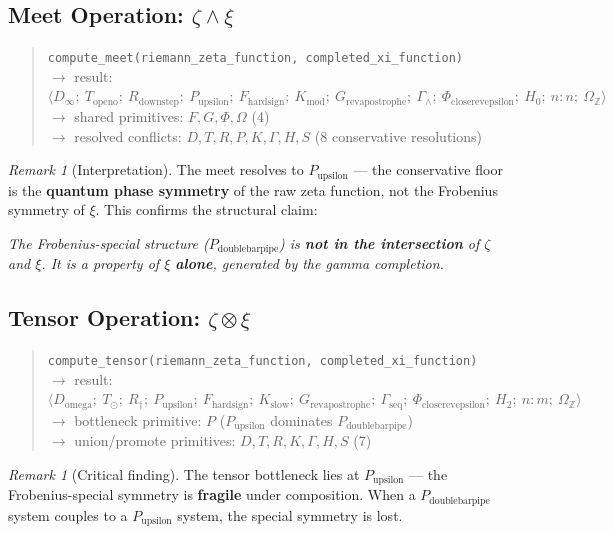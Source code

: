 \documentclass[12pt,oneside]{article}
\theoremstyle{definition}
\theoremstyle{remark}
\newtheorem{remark}[theorem]{Remark}
\newcommand{\Domega}{D_{\text{omega}}}
\newcommand{\Dinfty}{D_{\infty}}
\newcommand{\Topeno}{T_{\text{openo}}}
\newcommand{\Rdownstep}{R_{\text{downstep}}}
\newcommand{\Pdoublebarpipe}{P_{\text{doublebarpipe}}}
\newcommand{\Pupsilon}{P_{\text{upsilon}}}
\newcommand{\Fhardsign}{F_{\text{hardsign}}}
\newcommand{\Grevapostrophe}{G_{\text{revapostrophe}}}
\newcommand{\Gammaseq}{\Gamma_{\text{seq}}}
\newcommand{\Gammaconj}{\Gamma_{\wedge}}
\newcommand{\Phicloserevepsilon}{\Phi_{\text{closerevepsilon}}}
\newcommand{\Hzero}{H_0}
\newcommand{\Htwo}{H_2}
\newcommand{\OmegaZ}{\Omega_{\mathbb{Z}}}
\begin{document}
\subsection{Meet Operation: $\zeta \wedge \xi$}

\begin{quote}
\texttt{compute\_meet(riemann\_zeta\_function, completed\_xi\_function)}\\
$\to$ result: $\langle \Dinfty;\ \Topeno;\ \Rdownstep;\ \Pupsilon;\ \Fhardsign;\ K_{\text{mod}};\ \Grevapostrophe;\ \Gammaconj;\ \Phicloserevepsilon;\ \Hzero;\ n{:}n;\ \OmegaZ \rangle$\\
$\to$ shared primitives: $F, G, \Phi, \Omega$ (4)\\
$\to$ resolved conflicts: $D, T, R, P, K, \Gamma, H, S$ (8 conservative resolutions)
\end{quote}

\begin{remark}[Interpretation]
The meet resolves to $\Pupsilon$ --- the conservative floor is the \textbf{quantum phase symmetry} of the raw zeta function, not the Frobenius symmetry of $\xi$. This confirms the structural claim:

\begin{center}
\itshape The Frobenius-special structure ($\Pdoublebarpipe$) is \textbf{not in the intersection} of $\zeta$ and $\xi$. It is a property of $\xi$ \textbf{alone}, generated by the gamma completion.
\end{center}
\end{remark}

\subsection{Tensor Operation: $\zeta \otimes \xi$}

\begin{quote}
\texttt{compute\_tensor(riemann\_zeta\_function, completed\_xi\_function)}\\
$\to$ result: $\langle \Domega;\ T_{\odot};\ R_{\dagger};\ \Pupsilon;\ \Fhardsign;\ K_{\text{slow}};\ \Grevapostrophe;\ \Gammaseq;\ \Phicloserevepsilon;\ \Htwo;\ n{:}m;\ \OmegaZ \rangle$\\
$\to$ bottleneck primitive: $P$ ($\Pupsilon$ dominates $\Pdoublebarpipe$)\\
$\to$ union/promote primitives: $D, T, R, K, \Gamma, H, S$ (7)
\end{quote}

\begin{remark}[Critical finding]
The tensor bottleneck lies at $\Pupsilon$ --- the Frobenius-special symmetry is \textbf{fragile} under composition. When a $\Pdoublebarpipe$ system couples to a $\Pupsilon$ system, the special symmetry is lost.
\end{remark}
\end{document}

